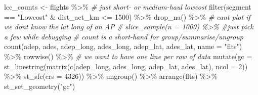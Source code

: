 \documentclass[
]{book}
\newenvironment{Shaded}{\begin{snugshade}}{\end{snugshade}}
\newcommand{\AttributeTok}[1]{\textcolor[rgb]{0.77,0.63,0.00}{#1}}
\newcommand{\CommentTok}[1]{\textcolor[rgb]{0.56,0.35,0.01}{\textit{#1}}}
\newcommand{\DecValTok}[1]{\textcolor[rgb]{0.00,0.00,0.81}{#1}}
\newcommand{\FunctionTok}[1]{\textcolor[rgb]{0.00,0.00,0.00}{#1}}
\newcommand{\NormalTok}[1]{#1}
\newcommand{\OtherTok}[1]{\textcolor[rgb]{0.56,0.35,0.01}{#1}}
\newcommand{\SpecialCharTok}[1]{\textcolor[rgb]{0.00,0.00,0.00}{#1}}
\newcommand{\StringTok}[1]{\textcolor[rgb]{0.31,0.60,0.02}{#1}}
\begin{document}
\begin{Shaded}
\begin{Highlighting}[]
\NormalTok{lcc\_counts }\OtherTok{\textless{}{-}}\NormalTok{ flights }\SpecialCharTok{\%\textgreater{}\%} 
  \CommentTok{\# just short{-} or medium{-}haul lowcost}
  \FunctionTok{filter}\NormalTok{(segment }\SpecialCharTok{==} \StringTok{"Lowcost"} \SpecialCharTok{\&}\NormalTok{ dist\_act\_km }\SpecialCharTok{\textless{}=} \DecValTok{1500}\NormalTok{) }\SpecialCharTok{\%\textgreater{}\%} 
  \FunctionTok{drop\_na}\NormalTok{() }\SpecialCharTok{\%\textgreater{}\%} \CommentTok{\# can\textquotesingle{}t plot if we don\textquotesingle{}t know the lat long of an AP }
  \CommentTok{\# slice\_sample(n = 1000) \%\textgreater{}\% \#just pick a few while debugging}
  \CommentTok{\# count is a short{-}hand for group/summarise/ungroup}
  \FunctionTok{count}\NormalTok{(adep, ades, adep\_long, ades\_long, adep\_lat, ades\_lat,}
        \AttributeTok{name =} \StringTok{"flts"}\NormalTok{) }\SpecialCharTok{\%\textgreater{}\%} 
  \FunctionTok{rowwise}\NormalTok{() }\SpecialCharTok{\%\textgreater{}\%} \CommentTok{\# we want to have one line per row of data}
  \FunctionTok{mutate}\NormalTok{(}\AttributeTok{gc =} \FunctionTok{st\_linestring}\NormalTok{(}\FunctionTok{matrix}\NormalTok{(}\FunctionTok{c}\NormalTok{(adep\_long, ades\_long, adep\_lat, ades\_lat), }\AttributeTok{ncol =} \DecValTok{2}\NormalTok{)) }\SpecialCharTok{\%\textgreater{}\%} 
           \FunctionTok{st\_sfc}\NormalTok{(}\AttributeTok{crs =} \DecValTok{4326}\NormalTok{)) }\SpecialCharTok{\%\textgreater{}\%} 
  \FunctionTok{ungroup}\NormalTok{() }\SpecialCharTok{\%\textgreater{}\%}
  \FunctionTok{arrange}\NormalTok{(flts) }\SpecialCharTok{\%\textgreater{}\%} 
  \FunctionTok{st\_set\_geometry}\NormalTok{(}\StringTok{"gc"}\NormalTok{) }


\end{Highlighting}
\end{Shaded}
\end{document}
